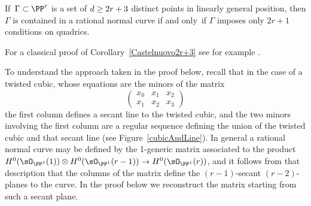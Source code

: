 \begin{corollary}
\label{Castelnuovo2r+3}
If\, $\Gamma\subset \PP^r$ is a set of $d \geq 2r+\nobreak 3$ distinct points in
%
%
linearly general position, then
$\Gamma$ is contained in a rational normal curve if and only~if $\Gamma$
imposes only $2r+1$
conditions on quadrics.
\end{corollary}
For a classical proof of Corollary~\ref{Castelnuovo2r+3} see for example
\cite[p.~531]{Griffiths-Harris1978}.

To understand the approach taken in the proof below, recall that in
the case of a twisted
cubic, whose equations are the minors of the matrix
$$
\begin{pmatrix}
x_0&x_1&x_2\\
x_1&x_2&x_3
\end{pmatrix}
$$
the first column defines a secant line to the twisted cubic, and the
two minors involving the first column are a regular sequence defining
the union of the twisted cubic and that secant line (see Figure~\ref{cubicAndLine}).
In general a rational normal curve may be defined by the 1-generic
matrix  associated to the product $H^0(\sO_{\PP^1}(1)) \otimes
H^0(\sO_{\PP^1}(r-1)) \to H^0(\sO_{\PP^1}(r))$,
and it follows from that description that the columns of the matrix
define the $(r-1)$-secant $(r-2)$-planes to the curve. In the proof
below we reconstruct the matrix starting from such a secant plane.

